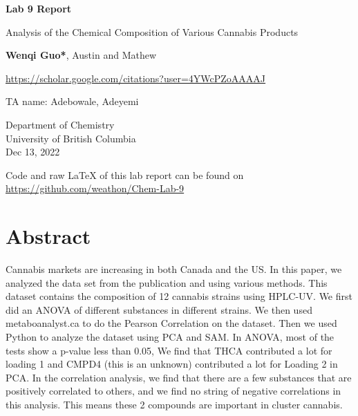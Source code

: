 \documentclass{article}
\begin{document}
\begin{titlepage}
    \begin{center}
        \vspace*{1cm}
            
        \Huge
        \textbf{Lab 9 Report}
            
        \vspace{0.5cm}
        \LARGE
        Analysis of the Chemical Composition of Various Cannabis Products
            
        \vspace{1.5cm}
            
        \textbf{Wenqi Guo*}, Austin and Mathew
        \begin{small}
            \url{https://scholar.google.com/citations?user=4YWcPZoAAAAJ}
        \end{small}

            
        \vfill
            
TA name:
Adebowale, Adeyemi 

            
        \vspace{0.8cm}
            

            
        \Large
        Department of Chemistry\\
        University of British Columbia\\
        Dec 13, 2022
            
    \end{center}
\end{titlepage}
Code and raw \LaTeX \; of this lab report can be found on \url{https://github.com/weathon/Chem-Lab-9}
\section*{Abstract}

Cannabis markets are increasing \cite{Lab Manuel} in both Canada and the US.   In this paper, we analyzed the data set from the publication  \cite{dataset1} and \cite{dataset2} using various methods. This dataset contains the composition of 12 cannabis strains using HPLC-UV. \cite{Lab Manuel, dataset1, dataset2} We first did an ANOVA of different substances in different strains. 
We then used metaboanalyst.ca to do the Pearson Correlation on the dataset. Then we used Python to analyze the dataset using PCA and SAM. In ANOVA, most of the tests show a p-value less than 0.05,  We find that THCA contributed a lot for loading 1 and CMPD4 (this is an unknown) contributed a lot for Loading 2 in PCA. In the correlation analysis, we find that there are a few substances that are positively correlated to others, and we find no string of negative correlations in this analysis. This means these 2 compounds are important in cluster cannabis. 
\end{document}
